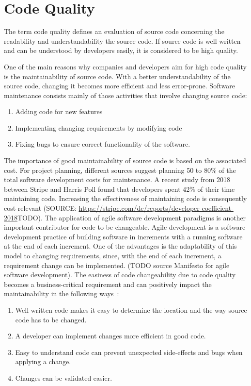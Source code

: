 \section{Code Quality}\label{sec:code_quality}
The term code quality defines an evaluation of source code concerning the readability and understandability the source code. If source code is well-written and can be understood by developers easily, it is considered to be high quality.

One of the main reasons why companies and developers aim for high code quality is the maintainability of source code. With a better understandability of the source code, changing it becomes more efficient and less error-prone.
Software maintenance consists mainly of those activities that involve changing source code:
\begin{enumerate}
    \item Adding code for new features
    \item Implementing changing requirements by modifying code
    \item Fixing bugs to ensure correct functionality of the software.
\end{enumerate}
The importance of good maintainability of source code is based on the associated cost.
For project planning, different sources suggest planning 50 to 80\% of the total software development costs for maintenance. A recent study from 2018 between Stripe and Harris Poll found that developers spent 42\% of their time maintaining code. Increasing the effectiveness of maintaining code is consequently cost-relevant (SOURCE: \url{https://stripe.com/de/reports/developer-coefficient-2018}TODO).
The application of agile software development paradigms is another important contributor for code to be changeable. Agile development is a software development practice of building software in increments with a running software at the end of each increment. One of the advantages is the adaptability of this model to changing requirements, since, with the end of each increment, a requirement change can be implemented. (TODO source Manifesto for agile software development).
The easiness of code changeability due to code quality becomes a business-critical requirement and can positively impact the maintainability in the following ways~\cite{baggen_standardized_2012}:
\begin{enumerate}
    \item Well-written code makes it easy to determine the location and the way source code has to be changed.
    \item A developer can implement changes more efficient in good code.
    \item Easy to understand code can prevent unexpected side-effects and bugs when applying a change.
    \item Changes can be validated easier. 
\end{enumerate}


